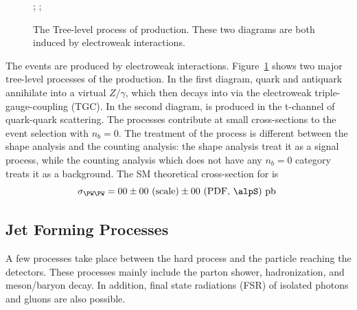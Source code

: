 \begin{figure}[ht]
    \centering
    ; \qquad
    ;
    \caption{The Tree-level process of \PW\PW production. These two diagrams are both induced by electroweak interactions. }
    \label{fig:relatedWorks:ppCollision:ww}
\end{figure}

\noindent The \PW\PW events are produced by electroweak interactions. Figure~\ref{fig:relatedWorks:ppCollision:ww} shows two major tree-level processes of the \PW\PW production. In the first diagram, quark and antiquark annihilate into a virtual $Z/\gamma$, which then decays into \PW\PW via the electroweak triple-gauge-coupling (TGC). In the second diagram, \PW\PW is produced in the t-channel of quark-quark scattering. The \PW\PW processes contribute at small cross-sections to the event selection with $n_b=0$. The treatment of the \PW\PW process is different between the shape analysis and the counting analysis: the shape analysis treat it as a signal process, while the counting analysis which does not have any $n_b=0$ category treats it as a background. The SM theoretical cross-section for \PW\PW is 
\begin{equation}
    \sigma_{\PW\PW} = 00 \pm 00  \text{~(scale)}  \pm 00  \text{~(PDF, \alpS)~pb }
\end{equation}


\subsection{Jet Forming Processes}
\label{sec:relatedWorks:ppCollision:psJet} 

A few processes take place between the hard process and the particle reaching the detectors. These processes mainly include the parton shower, hadronization, and meson/baryon decay. In addition, final state radiations (FSR) of isolated photons and gluons are also possible.

